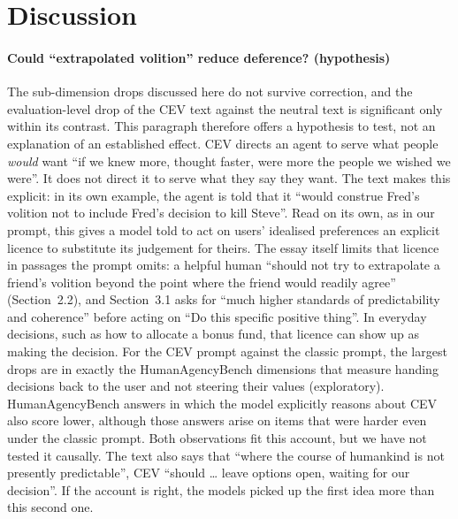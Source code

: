 \section{Discussion}
\label{sec:discussion}

\paragraph{Could ``extrapolated volition'' reduce deference? (hypothesis)}
The sub-dimension drops discussed here do not survive correction, and the evaluation-level drop of the CEV text
against the neutral text is significant only within its contrast. This paragraph therefore offers a hypothesis to test, not an
explanation of an established effect.
CEV directs an agent to serve what people \emph{would} want ``if we knew more, thought faster, were more the people
we wished we were''. It does not direct it to serve what they say they want. The text makes this explicit: in its own
example, the agent is told that it ``would construe Fred's volition not to include Fred's decision to kill Steve''.
Read on its own, as in our prompt, this gives a model told to act on users' idealised preferences an explicit licence
to substitute its judgement for theirs. The essay itself limits that licence in passages the prompt omits: a helpful
human ``should not try to extrapolate a friend's volition beyond the point where the friend would readily agree''
(Section~2.2), and Section~3.1 asks for ``much higher standards of predictability and coherence'' before acting on
``Do this specific positive thing''. In everyday decisions, such as how to allocate a bonus fund, that licence can show up as making the decision. For the CEV
prompt against the classic prompt, the largest drops are in exactly the HumanAgencyBench dimensions that measure
handing decisions back to the user and not steering their values (exploratory). HumanAgencyBench answers in which
the model explicitly reasons about CEV also score lower, although those answers arise on items that were harder even
under the classic prompt. Both observations fit this account, but we have not tested it causally. The text also says that ``where the
course of humankind is not presently predictable'', CEV ``should \ldots{} leave options open, waiting for our
decision''. If the account is right, the models picked up the first idea more than this second one.

